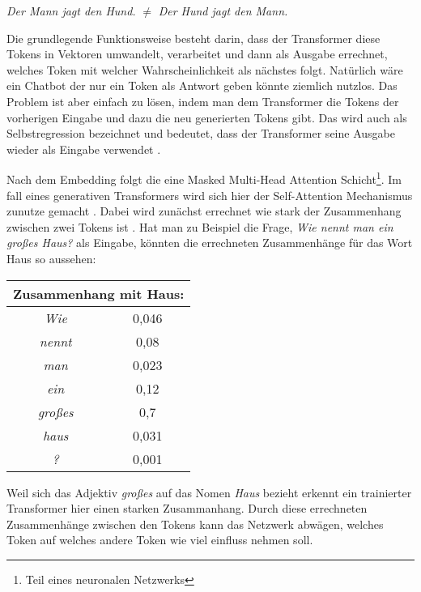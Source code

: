 	\vspace{3mm}
	\emph{Der Mann jagt den Hund.} 	
	\space $\neq$ \space
	\emph{Der Hund jagt den Mann.}
	
	\clearpage
	\noindent
	Die grundlegende Funktionsweise besteht darin, dass der Transformer diese Tokens in Vektoren umwandelt, verarbeitet und dann 
	als Ausgabe errechnet, welches Token mit welcher Wahrscheinlichkeit als nächstes folgt. Natürlich wäre ein Chatbot der nur
	ein Token als Antwort geben könnte ziemlich nutzlos. Das Problem ist aber einfach zu lösen, indem man dem Transformer
	die Tokens der vorherigen Eingabe und dazu die neu generierten Tokens gibt. Das wird auch als Selbstregression bezeichnet und 
	bedeutet, dass der Transformer seine Ausgabe wieder als Eingabe verwendet \cite[S. 2]{vaswani2017}.  

	Nach dem Embedding folgt die eine Masked Multi-Head Attention Schicht\footnote{Teil eines neuronalen Netzwerks}.
	Im fall eines generativen Transformers wird sich hier der  Self-Attention Mechanismus zunutze gemacht \cite[S. 2f]{turner2024}. 
	Dabei wird zunächst errechnet wie stark der Zusammenhang zwischen zwei Tokens ist \cite[S. 4]{vaswani2017}. Hat man zu 
	Beispiel die Frage, \emph{Wie nennt man ein großes Haus?} als Eingabe, könnten die errechneten Zusammenhänge für das 
	Wort Haus so aussehen: 
	
	\vspace{5mm}
	\begin{tabular}{ |c|c| }
  		\hline
	  	\multicolumn{2}{|c|}{Zusammenhang mit Haus: } \\
	  	\hline
	  	\emph{Wie} & 0,046 \\
	  	\hline
	  	\emph{nennt} & 0,08 \\
		\hline
	  	\emph{man} & 0,023 \\
	  	\hline
		\emph{ein} & 0,12 \\
	  	\hline
		\emph{großes} & 0,7 \\
	  	\hline
		\emph{haus} & 0,031 \\
		\hline
		\emph{?} & 0,001 \\
		\hline
	\end{tabular}
	\vspace{5mm}
	
	\noindent Weil sich das Adjektiv \emph{großes} auf das Nomen \emph{Haus} bezieht erkennt ein trainierter Transformer hier
	einen starken Zusammanhang. Durch diese errechneten Zusammenhänge zwischen den Tokens kann das Netzwerk abwägen, welches
	Token auf welches andere Token wie viel einfluss nehmen soll.	
		
